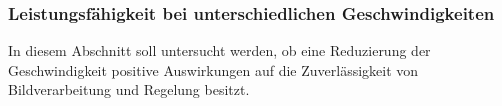 \subsubsection{Leistungsfähigkeit bei unterschiedlichen Geschwindigkeiten}
In diesem Abschnitt soll untersucht werden, ob eine Reduzierung der Geschwindigkeit positive Auswirkungen auf die Zuverlässigkeit von Bildverarbeitung und Regelung besitzt.